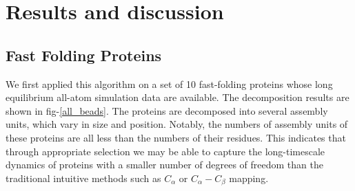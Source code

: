 \documentclass[journal=jacsat,manuscript=article]{achemso}
\begin{document}
\section{Results and discussion}

\subsection{Fast Folding Proteins}

We first applied this algorithm on a set of 10 fast-folding proteins whose long equilibrium all-atom simulation data are available\cite{DE_Shaw_fast-folding}. The decomposition results are shown in fig-\ref{all_beads}. The proteins are decomposed into several assembly units, which vary in size and position. Notably, the numbers of assembly units of these proteins are all less than the numbers of their residues. This indicates that through appropriate selection we may be able to capture the long-timescale dynamics of proteins with a smaller number of degrees of freedom than the traditional intuitive methods such as $C_{\alpha}$ or $C_{\alpha}-C_{\beta}$ mapping.
\end{document}

